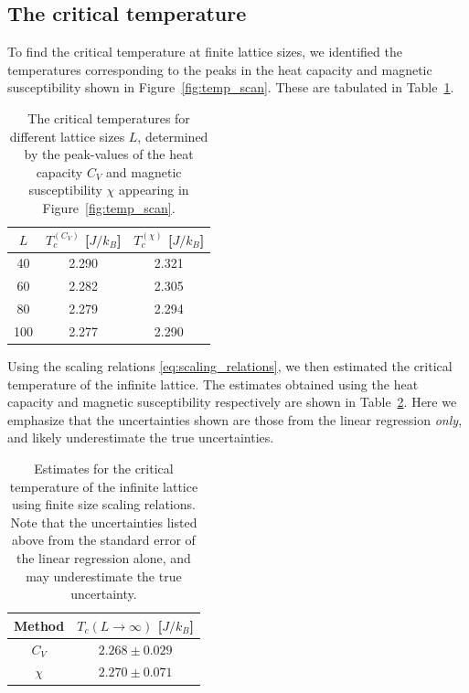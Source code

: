 \documentclass[english,notitlepage,reprint]{revtex4-2}  %
\begin{document}
\subsection{The critical temperature}   \label{sec:Critical_temp_results}
To find the critical temperature at finite lattice sizes, we identified the temperatures corresponding to the peaks in the heat capacity and magnetic susceptibility shown in Figure~\ref{fig:temp_scan}.
These are tabulated in Table~\ref{table:crit_temps}.
\begin{table}[h!]
    \centering
    \setlength{\tabcolsep}{4pt}
    \begin{tabular}{c|c|c}
    {$L$} & {$T_c^{(C_V)}$} [$J/k_B$] & {$T_c^{(\chi)}$} [$J/k_B$] \\
    \hline
        40  & 2.290 & 2.321 \\
        60  & 2.282 & 2.305 \\
        80  & 2.279 & 2.294 \\
        100 & 2.277 & 2.290 \\
    \end{tabular}
    \caption{The critical temperatures for different lattice sizes \(L\), determined by the peak-values of the heat capacity \(C_V\) and magnetic susceptibility \(\chi\) appearing in Figure~\ref{fig:temp_scan}.}
    \label{table:crit_temps}
\end{table}
Using the scaling relations \eqref{eq:scaling_relations}, we then estimated the critical temperature of the infinite lattice.
The estimates obtained using the heat capacity and magnetic susceptibility respectively are shown in Table~\ref{table:crit_temp_infinite}.
Here we emphasize that the uncertainties shown are those from the linear regression \textit{only}, and likely underestimate the true uncertainties.
\begin{table}[h!]
    \centering
    \setlength{\tabcolsep}{12pt}
    \renewcommand{\arraystretch}{1.2}
    \begin{tabular}{c|c}
    {Method} & {$T_c(L\rightarrow\infty)$ [$J/k_B$]} \\
    \hline
        $C_V$  & $2.268 \pm 0.029$ \\
        $\chi$ & $2.270 \pm 0.071$ \\
    \end{tabular}
    \caption{
        Estimates for the critical temperature of the infinite lattice using finite size scaling relations.
        Note that the uncertainties listed above from the standard error of the linear regression alone, and may underestimate the true uncertainty.
    }
    \label{table:crit_temp_infinite}
\end{table}
\end{document}
